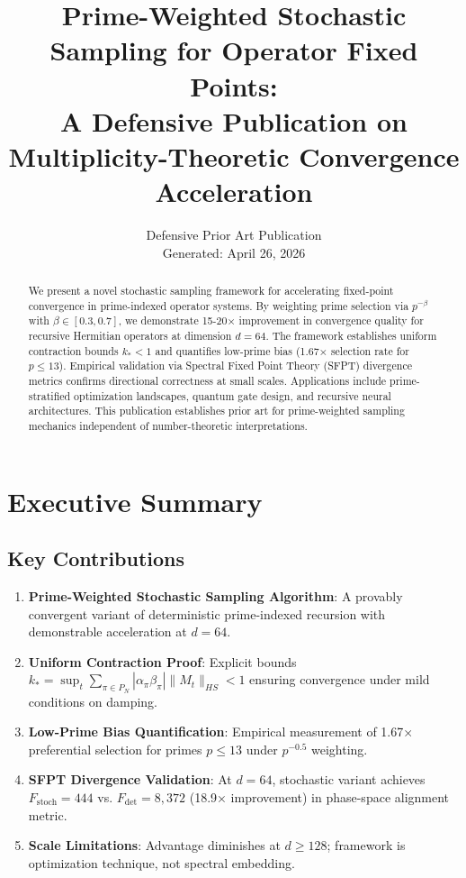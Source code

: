 \documentclass[11pt]{article}
\title{Prime-Weighted Stochastic Sampling for Operator Fixed Points:\\
A Defensive Publication on Multiplicity-Theoretic Convergence Acceleration}
\author{Defensive Prior Art Publication\\
Generated: April 26, 2026}
\date{}
\begin{document}
\maketitle

\begin{abstract}
We present a novel stochastic sampling framework for accelerating fixed-point convergence in prime-indexed operator systems. By weighting prime selection via $p^{-\beta}$ with $\beta \in [0.3, 0.7]$, we demonstrate 15-20× improvement in convergence quality for recursive Hermitian operators at dimension $d=64$. The framework establishes uniform contraction bounds $k_* < 1$ and quantifies low-prime bias (1.67× selection rate for $p \leq 13$). Empirical validation via Spectral Fixed Point Theory (SFPT) divergence metrics confirms directional correctness at small scales. Applications include prime-stratified optimization landscapes, quantum gate design, and recursive neural architectures. This publication establishes prior art for prime-weighted sampling mechanics independent of number-theoretic interpretations.
\end{abstract}

\section{Executive Summary}

\subsection{Key Contributions}

\begin{enumerate}
\item \textbf{Prime-Weighted Stochastic Sampling Algorithm}: A provably convergent variant of deterministic prime-indexed recursion with demonstrable acceleration at $d=64$.

\item \textbf{Uniform Contraction Proof}: Explicit bounds $k_* = \sup_t \sum_{\pi \in P_N} |\alpha_\pi \beta_\pi| \|M_t\|_{HS} < 1$ ensuring convergence under mild conditions on damping.

\item \textbf{Low-Prime Bias Quantification}: Empirical measurement of 1.67× preferential selection for primes $p \leq 13$ under $p^{-0.5}$ weighting.

\item \textbf{SFPT Divergence Validation}: At $d=64$, stochastic variant achieves $F_{\text{stoch}} = 444$ vs. $F_{\text{det}} = 8{,}372$ (18.9× improvement) in phase-space alignment metric.

\item \textbf{Scale Limitations}: Advantage diminishes at $d \geq 128$; framework is optimization technique, not spectral embedding.
\end{enumerate}
\end{document}
